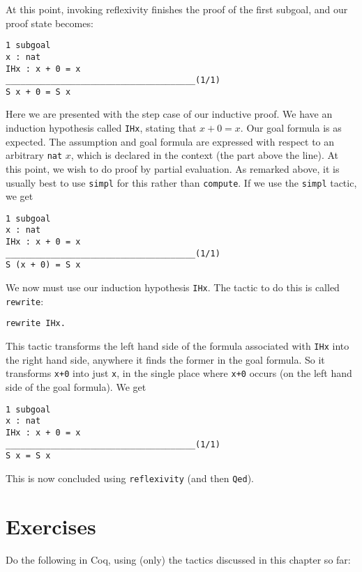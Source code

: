 \documentclass{book}[12pt]
\begin{document}
\noindent At this point, invoking reflexivity finishes the proof of the
first subgoal, and our proof state becomes:

\begin{verbatim}
1 subgoal
x : nat
IHx : x + 0 = x
______________________________________(1/1)
S x + 0 = S x
\end{verbatim}

\noindent Here we are presented with the step case of our inductive
proof.  We have an induction hypothesis called \texttt{IHx}, stating
that $x + 0 = x$.  Our goal formula is as expected.  The assumption
and goal formula are expressed with respect to an arbitrary
\texttt{nat} $x$, which is declared in the context (the part above the
line).  At this point, we wish to do proof by partial evaluation.  As
remarked above, it is usually best to use \texttt{simpl} for this
rather than \texttt{compute}.  If we use the \texttt{simpl} tactic, we
get

\begin{verbatim}
1 subgoal
x : nat
IHx : x + 0 = x
______________________________________(1/1)
S (x + 0) = S x
\end{verbatim}

\noindent We now must use our induction hypothesis \texttt{IHx}.  The tactic
to do this is called \texttt{rewrite}:

\begin{verbatim}
rewrite IHx.
\end{verbatim}

\noindent This tactic transforms the left hand side of the formula
associated with \texttt{IHx} into the right hand side, anywhere it
finds the former in the goal formula.  So it transforms \texttt{x+0}
into just \texttt{x}, in the single place where \texttt{x+0} occurs
(on the left hand side of the goal formula).  We get

\begin{verbatim}
1 subgoal
x : nat
IHx : x + 0 = x
______________________________________(1/1)
S x = S x
\end{verbatim}

\noindent This is now concluded using \texttt{reflexivity} (and then
\texttt{Qed}).

\section{Exercises}

Do the following in Coq, using (only) the tactics discussed in
this chapter so far:
\end{document}
